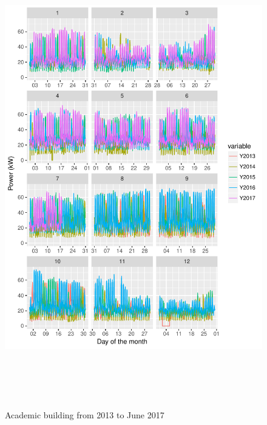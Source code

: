 \documentclass[11pt, oneside]{article}   	%
\begin{document}
\begin{figure}
\includegraphics[width=30cm,height=20cm,keepaspectratio]{acad_build.pdf}
\caption{Academic building from 2013  to June 2017}
\end{figure}
\end{document}
